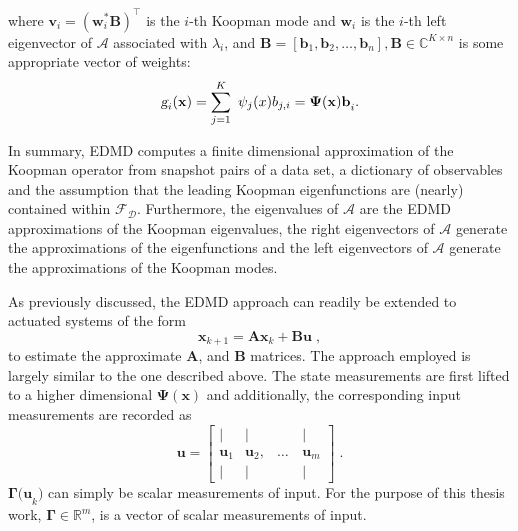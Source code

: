 \begin{itemize}
\begin{equation}
    \end{equation}
    where $\boldsymbol{v}_i = (\mathbf{w}_i^*\mathbf{B})^\top$ is the $i$-th Koopman mode and $\mathbf{w}_i$ is the $i$-th left eigenvector of $\mathbf{\mathcal{A}}$ associated with $\lambda_i$, and $\mathbf{B} = [\mathbf{b}_1,\mathbf{b}_2,\dots,\mathbf{b}_n], \mathbf{B} \in \mathbb{C}^{K \times n}$ is some appropriate vector of weights:
    \begin{equation*}
        \textsl{g}_i(\mathbf{x}) = \sum_{j=1}^K~\psi_j(x) b_{j,i} = \mathbf{\Psi(x)b}_i.
    \end{equation*} 
\end{itemize}
 \newpage
 In summary, EDMD computes a finite dimensional approximation of the Koopman operator from snapshot pairs of a data set, a dictionary of observables and the assumption that the leading Koopman eigenfunctions are (nearly) contained within $\mathcal{F_D}$. Furthermore, the eigenvalues of $\mathbf{\mathcal{A}}$ are the EDMD approximations of the Koopman eigenvalues, the right eigenvectors of $\mathbf{\mathcal{A}}$ generate the approximations of the eigenfunctions and the left eigenvectors of $\mathbf{\mathcal{A}}$ generate the approximations of the Koopman modes.
 \par
As previously discussed, the EDMD approach can readily be extended to actuated systems of the form
% 
\begin{equation}
\label{eq:EDMDc}
    \mathbf{x}_{k+1} = \mathbf{A}\mathbf{x}_k + \mathbf{Bu}\;,
\end{equation}
to estimate the approximate $\mathbf{A}$, and $\mathbf{B}$ matrices. The approach employed is largely similar to the one described above. The state measurements are first lifted to a higher dimensional $\mathbf{\Psi(x)}$ and additionally, the corresponding input measurements are recorded as
% 
\begin{equation}
    \label{Eq: InputMatrix}
    \mathbf{u} =  \begin{bmatrix}
        |                &  |               &    \quad&         |         \\
        \mathbf{u}_{1}   &  \mathbf{u}_{2}, &   \dots & \mathbf{u}_{m} \\
        |                &  |               &    \quad&         |       
        \end{bmatrix}  \;.
\end{equation}
% 
$\mathbf{\Gamma(u}_k)$ can simply be scalar measurements of input.  For the purpose of this thesis work, $\mathbf{\Gamma} \in \mathbb{R}^{m}$, is a vector of scalar measurements of input.
